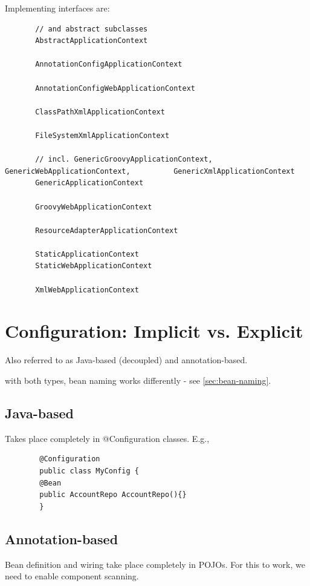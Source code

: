 \documentclass{scrartcl}
\begin{document}
Implementing interfaces are:

\begin{lstlisting}
       // and abstract subclasses
       AbstractApplicationContext

       AnnotationConfigApplicationContext

       AnnotationConfigWebApplicationContext

       ClassPathXmlApplicationContext

       FileSystemXmlApplicationContext

       // incl. GenericGroovyApplicationContext, GenericWebApplicationContext,          GenericXmlApplicationContext
       GenericApplicationContext

       GroovyWebApplicationContext

       ResourceAdapterApplicationContext

       StaticApplicationContext
       StaticWebApplicationContext

       XmlWebApplicationContext
\end{lstlisting}

\section{Configuration: Implicit vs. Explicit}

    Also referred to as Java-based (decoupled) and annotation-based.

    with both types, bean naming works differently - see \ref{sec:bean-naming}.

\subsection{Java-based}

    Takes place completely in @Configuration classes. E.g.,

    \begin{lstlisting}
        @Configuration
        public class MyConfig {
        @Bean
        public AccountRepo AccountRepo(){}
        }
    \end{lstlisting}

\subsection{Annotation-based}

    Bean definition and wiring take place completely in POJOs. For this to work, we need to enable component scanning.
\end{document}
